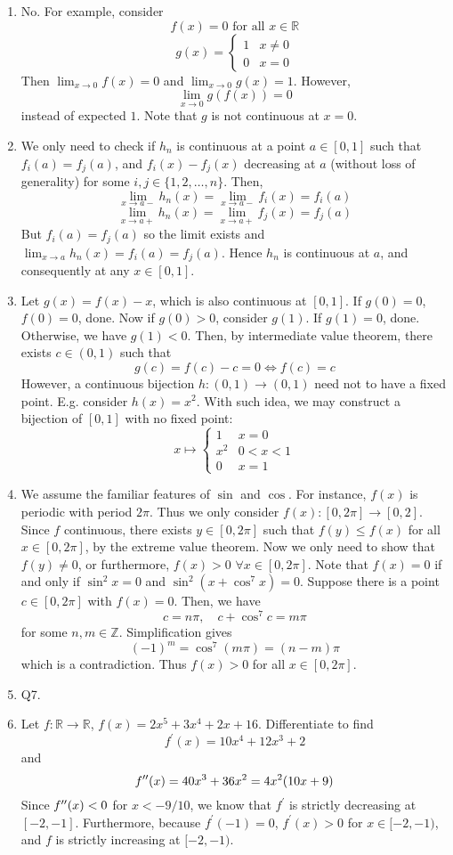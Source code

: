 \documentclass[10pt, a4paper, twoside]{report}
\begin{document}
\begin{enumerate}[{1.}]
    \item No. For example, consider 
    \[f(x)=0\text{  for all }x\in\mathbb{R}\]
    \[g(x)=\begin{cases}
        1 & x\neq 0 \\
        0 & x=0
    \end{cases}\]
    Then \(\lim_{x\to 0}f(x)=0\) and \(\lim_{x\to 0}g(x)=1\). However, 
    \[\lim_{x\to 0}g(f(x))=0\]
    instead of expected \(1\). Note that \(g\) is not continuous at \(x=0\).
    \item We only need to check if \(h_n\) is continuous at a point \(a\in[0,1]\) such that \(f_i(a)=f_j(a)\), and \(f_i(x)-f_j(x)\) decreasing at \(a\) (without loss of generality) for some \(i,j\in\{1,2,\ldots,n\}\). Then,
    \[\lim_{x\to a-}h_n(x)=\lim_{x\to a-}f_i(x)=f_i(a)\]
    \[\lim_{x\to a+}h_n(x)=\lim_{x\to a+}f_j(x)=f_j(a)\]
    But \(f_i(a)=f_j(a)\) so the limit exists and \(\lim_{x\to a}h_n(x)=f_i(a)=f_j(a)\). Hence \(h_n\) is continuous at \(a\), and consequently at any \(x\in[0,1]\).
    \item Let \(g(x)=f(x)-x\), which is also continuous at \([0,1]\). If \(g(0)=0\), \(f(0)=0\), done. Now if \(g(0)>0\), consider \(g(1)\). If \(g(1)=0\), done. Otherwise, we have \(g(1)<0\). Then, by intermediate value theorem, there exists \(c\in(0,1)\) such that 
    \[g(c)=f(c)-c=0\Leftrightarrow f(c)=c\]
    However, a continuous bijection \(h:(0,1)\to(0,1)\) need not to have a fixed point. E.g. consider \(h(x)=x^2\). With such idea, we may construct a bijection of \([0,1]\) with no fixed point:
    \[x\mapsto \begin{cases}
        1 & x=0 \\
        x^2 & 0<x<1 \\
        0 & x=1
    \end{cases}\]
    \item We assume the familiar features of \(\sin\) and \(\cos\). For instance, \(f(x)\) is periodic with period \(2\pi\). Thus we only consider \(f(x):[0,2\pi]\to[0,2]\). Since \(f\) continuous, there exists \(y\in[0,2\pi]\) such that \(f(y)\leq f(x)\) for all \(x\in[0,2\pi]\), by the extreme value theorem. Now we only need to show that \(f(y)\neq 0\), or furthermore, \(f(x)>0\) \(\forall x\in[0,2\pi]\). Note that \(f(x)=0\) if and only if \(\sin^2x=0\) and \(\sin^2(x+\cos^7x)=0\). Suppose there is a point \(c\in[0,2\pi]\) with \(f(x)=0\). Then, we have
    \[c=n\pi,\quad c+\cos^7c=m\pi\]
    for some \(n,m\in\mathbb{Z}\). Simplification gives
    \[(-1)^m=\cos^7(m\pi)=(n-m)\pi\]
    which is a contradiction. Thus \(f(x)>0\) for all \(x\in[0,2\pi]\).
    \item Q7.
    \item Let \(f:\mathbb{R}\to\mathbb{R}\), \(f(x)=2x^5+3x^4+2x+16\). Differentiate to find 
    \[f^\prime(x)=10x^4+12x^3+2\]
    and 
    \[f^{\prime\prime}(x)=40x^3+36x^2=4x^2(10x+9)\]
    Since \(f^{\prime\prime}(x)<0\) for \(x<-9/10\), we know that \(f^\prime\) is strictly decreasing at \([-2,-1]\). Furthermore, because \(f^\prime(-1)=0\), \(f^\prime(x)> 0\) for \(x\in[-2,-1)\), and \(f\) is strictly increasing at \([-2,-1)\). 
    

\end{enumerate}
\end{document}
